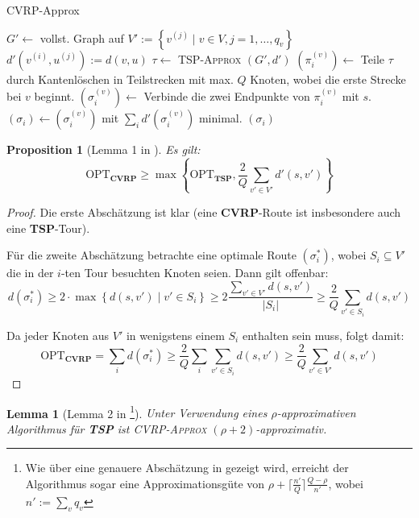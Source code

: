 \documentclass[a4paper,ngerman,12pt,bibtotoc]{scrartcl}
\theoremstyle{definition}
\theoremstyle{plain}
\newtheorem{prop}[defn]{Proposition}
\newtheorem{lemma}[defn]{Lemma}
\theoremstyle{remark}
\newcommand{\RR}{\mathbb{R}}
\newcommand{\OPT}{\mathrm{OPT}}
\newcommand{\TSP}{\textbf{TSP}}
\newcommand{\CVRP}{\textbf{CVRP}}
\begin{document}
	\begin{algorithm}[H]
		\caption{CVRP-Approx}\label{AlgCVRP}
		\begin{algorithmic}[1]
			\Procedure{CVRP}{$G=(V,E)$, $d:E\to \RR_{\geq 0}, Q, (q_v)_{v\in V}$}
			\State $G' \gets$ vollst. Graph auf $V' := \left\lbrace v^{(j)} \mid v \in V, j=1,\dots,q_v\right\rbrace$
			\State $d'(v^{(i)}, u^{(j)}) := d(v,u)$
			\State $\tau \gets$ \textsc{TSP-Approx} $\left(G', d'\right)$
				\State $\left(\pi_i^{(v)}\right) \gets$ Teile $\tau$ durch Kantenlöschen in Teilstrecken mit max. $Q$ Knoten,
				\Statex \hspace{8em} wobei die erste Strecke bei $v$ beginnt.
				\State $\left(\sigma_i^{(v)}\right) \gets$ Verbinde die zwei Endpunkte von $\pi^{(v)}_i$ mit $s$.
			\EndFor
			\State $\left(\sigma_i\right) \gets \left(\sigma_i^{(v)}\right)$ mit $\sum_i d'(\sigma_i^{(v)})$ minimal.
			\State \Return $\left(\sigma_i\right)$
			\EndProcedure
		\end{algorithmic}
	\end{algorithm}	
	
	\begin{prop}[Lemma 1 in \cite{CVRPApprox}]\label{CVRPLowerBound}
		Es gilt: 
			\[\OPT_\CVRP \geq \max\left\lbrace\OPT_\TSP, \frac{2}{Q}\sum_{v'\in V'}d'(s,v')\right\rbrace\]
	\end{prop}
	
	\begin{proof}
		Die erste Abschätzung ist klar (eine \CVRP-Route ist insbesondere auch eine \TSP-Tour).
		
		Für die zweite Abschätzung betrachte eine optimale Route $\left(\sigma_i^\ast\right)$, wobei $S_i \subseteq V'$ die in der $i$-ten Tour besuchten Knoten seien. Dann gilt offenbar:
			\[d\left(\sigma_i^\ast\right) \geq 2\cdot \max\left\lbrace d(s,v') \mid v'\in S_i\right\rbrace \geq 2\frac{\sum_{v'\in V'}d(s,v')}{\left|S_i\right|} \geq \frac{2}{Q}\sum_{v'\in S_i}d(s,v')\]
		
		Da jeder Knoten aus $V'$ in wenigstens einem $S_i$ enthalten sein muss, folgt damit:
			\[\OPT_\CVRP = \sum_i d\left(\sigma_i^\ast\right) \geq \frac{2}{Q}\sum_i\sum_{v'\in S_i}d(s,v') \geq \frac{2}{Q}\sum_{v'\in V'}d(s,v')\]
	\end{proof}
	
	\begin{lemma}[Lemma 2 in \cite{CVRPApprox}\footnote{Wie über eine genauere Abschätzung in \cite{CVRPApprox} gezeigt wird, erreicht der Algorithmus sogar eine Approximationsgüte von $\rho + \lceil\frac{n'}{Q}\rceil \frac{Q-\rho}{n'}$, wobei $n' := \sum_v q_v$}]\label{AlgCVRPProof}
		Unter Verwendung eines $\rho$-approximativen Algorithmus für \TSP{} ist \textsc{CVRP-Approx} $(\rho+2)$-approximativ.
	\end{lemma}	
	
\end{document}
